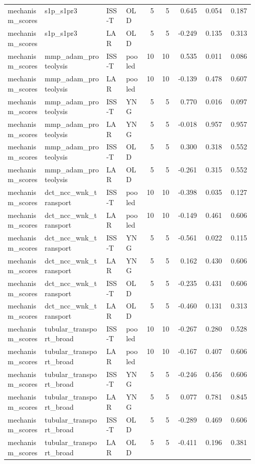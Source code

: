 \documentclass[11pt]{article}
\begin{document}
\begin{landscape}
\begin{longtable}{p{0.15\linewidth}p{0.25\linewidth}p{0.08\linewidth}p{0.08\linewidth}rrrrr}
mechanism\_scores & s1p\_s1pr3 & ISS-T & OLD & 5 & 5 & 0.645 & 0.054 & 0.187 \\
mechanism\_scores & s1p\_s1pr3 & LAR & OLD & 5 & 5 & -0.249 & 0.135 & 0.313 \\
mechanism\_scores & mmp\_adam\_proteolysis & ISS-T & pooled & 10 & 10 & 0.535 & 0.011 & 0.086 \\
mechanism\_scores & mmp\_adam\_proteolysis & LAR & pooled & 10 & 10 & -0.139 & 0.478 & 0.607 \\
mechanism\_scores & mmp\_adam\_proteolysis & ISS-T & YNG & 5 & 5 & 0.770 & 0.016 & 0.097 \\
mechanism\_scores & mmp\_adam\_proteolysis & LAR & YNG & 5 & 5 & -0.018 & 0.957 & 0.957 \\
mechanism\_scores & mmp\_adam\_proteolysis & ISS-T & OLD & 5 & 5 & 0.300 & 0.318 & 0.552 \\
mechanism\_scores & mmp\_adam\_proteolysis & LAR & OLD & 5 & 5 & -0.261 & 0.315 & 0.552 \\
mechanism\_scores & dct\_ncc\_wnk\_transport & ISS-T & pooled & 10 & 10 & -0.398 & 0.035 & 0.127 \\
mechanism\_scores & dct\_ncc\_wnk\_transport & LAR & pooled & 10 & 10 & -0.149 & 0.461 & 0.606 \\
mechanism\_scores & dct\_ncc\_wnk\_transport & ISS-T & YNG & 5 & 5 & -0.561 & 0.022 & 0.115 \\
mechanism\_scores & dct\_ncc\_wnk\_transport & LAR & YNG & 5 & 5 & 0.162 & 0.430 & 0.606 \\
mechanism\_scores & dct\_ncc\_wnk\_transport & ISS-T & OLD & 5 & 5 & -0.235 & 0.431 & 0.606 \\
mechanism\_scores & dct\_ncc\_wnk\_transport & LAR & OLD & 5 & 5 & -0.460 & 0.131 & 0.313 \\
mechanism\_scores & tubular\_transport\_broad & ISS-T & pooled & 10 & 10 & -0.267 & 0.280 & 0.528 \\
mechanism\_scores & tubular\_transport\_broad & LAR & pooled & 10 & 10 & -0.167 & 0.407 & 0.606 \\
mechanism\_scores & tubular\_transport\_broad & ISS-T & YNG & 5 & 5 & -0.246 & 0.456 & 0.606 \\
mechanism\_scores & tubular\_transport\_broad & LAR & YNG & 5 & 5 & 0.077 & 0.781 & 0.845 \\
mechanism\_scores & tubular\_transport\_broad & ISS-T & OLD & 5 & 5 & -0.289 & 0.469 & 0.606 \\
mechanism\_scores & tubular\_transport\_broad & LAR & OLD & 5 & 5 & -0.411 & 0.196 & 0.381 \\

\end{longtable}
\end{landscape}
\end{document}
